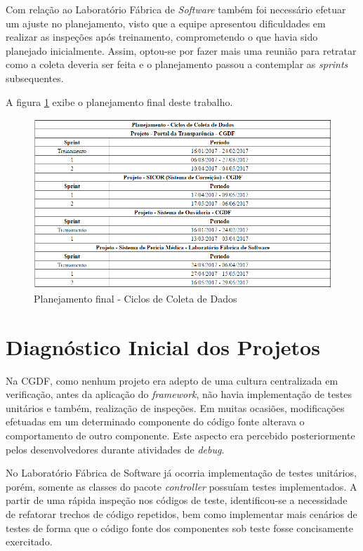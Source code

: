 Com relação ao Laboratório Fábrica de \textit{Software} também foi necessário efetuar um ajuste no planejamento, visto que a equipe apresentou dificuldades em realizar as inspeções após treinamento, comprometendo o que havia sido planejado inicialmente. Assim, optou-se por fazer mais uma reunião para retratar como a coleta deveria ser feita e o planejamento passou a contemplar as \textit{sprints} subsequentes.

A figura \ref{fig:planejamento2} exibe o planejamento final deste trabalho.

\begin{figure}[h]
\includegraphics[width=\textwidth]{figuras/planejamento2.png}
\caption{Planejamento final - Ciclos de Coleta de Dados}
\label{fig:planejamento2}
\end{figure}

\section{Diagnóstico Inicial dos Projetos}

Na CGDF, como nenhum projeto era adepto de uma cultura centralizada em verificação, antes da aplicação do \textit{framework}, não havia implementação de testes unitários e também, realização de inspeções. Em muitas ocasiões, modificações efetuadas em um determinado componente do código fonte alterava o comportamento de outro componente. Este aspecto era percebido posteriormente pelos desenvolvedores durante atividades de \textit{debug}.

No Laboratório Fábrica de Software já ocorria implementação de testes unitários, porém, somente as classes do pacote \textit{controller} possuíam testes implementados. A partir de uma rápida inspeção nos códigos de teste, identificou-se a necessidade de refatorar trechos de código repetidos, bem como implementar mais cenários de testes de forma que o código fonte dos componentes sob teste fosse concisamente exercitado.

